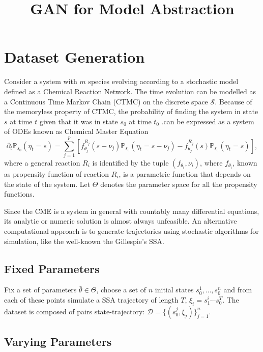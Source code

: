 \documentclass{article}
\title{GAN for Model Abstraction}
\author{}
\date{}
\begin{document}
\maketitle

\section{Dataset Generation}

Consider a system with $m$ species evolving according to a stochastic model defined as a Chemical Reaction Network. The time evolution can be modelled as a Continuous Time Markov
Chain (CTMC) on the discrete space $\mathcal{S}$. Because of the memoryless property of CTMC, 
the probability of finding the
system in state $s$ at time $t$ given that it was in state $s_0$ at time $t_0$ .can be expressed as a system of ODEs known as Chemical Master Equation
\begin{equation}
    \partial_t\mathbb{P}_{s_0}(\eta_t=s) = \sum_{j=1}^p\left[ 
    f_{\theta_j}^{R_j}(s-\nu_j)\mathbb{P}_{s_0}(\eta_t=s-\nu_j)-f_{\theta_j}^{R_j}(s)\mathbb{P}_{s_0}(\eta_t =s)
    \right],
\end{equation}
where a general reaction $R_i$ is identified by the tuple $(f_{\theta_i},\nu_i)$, where $f_{\theta_i}$, known as propensity function of reaction $R_i$, is a parametric function that depends on the state of the system. Let $\Theta$ denotes the parameter space for all the propensity functions.

Since the CME is a system in general with countably many differential equations, its analytic or numeric solution is almost always unfeasible. An alternative
computational approach is to generate trajectories using stochastic algorithms
for simulation, like the well-known the Gillespie’s SSA.

\subsection{Fixed Parameters}

Fix a set of parameters $\bar{\theta}\in\Theta$, choose a set of $n$ initial states $s_0^1,\dots , s_0^n$ and from each of these points simulate a SSA trajectory of length $T$, $\xi_i = s_1^i\cdots s_0^T$. The dataset is composed of pairs state-trajectory: $\mathcal{D}= \{(s_0^j,\xi_j)\}_{j=1}^n$.

\subsection{Varying Parameters}
\end{document}
